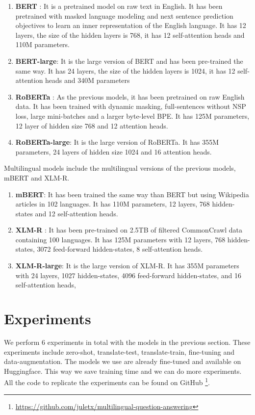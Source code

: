 \documentclass[11pt]{article}
\begin{document}
\begin{enumerate}
    \item \textbf{BERT} \cite{BERT}: It is a pretrained model on raw text in English. It has been pretrained with masked language modeling and next sentence prediction objectives to learn an inner representation of the English language. It has 12 layers, the size of the hidden layers is 768, it has 12 self-attention heads and 110M parameters.
    \item \textbf{BERT-large}: It is the large version of BERT and has been pre-trained the same way. It has 24 layers, the size of the hidden layers is 1024, it has 12 self-attention heads and 340M parameters
    \item \textbf{RoBERTa} \cite{ROBERTA}: As the previous models, it has been pretrained on raw English data. It has been trained with dynamic masking, full-sentences without NSP loss, large mini-batches and a larger byte-level BPE. It has 125M parameters, 12 layer of hidden size 768 and 12 attention heads.
    \item \textbf{RoBERTa-large}: It is the large version of RoBERTa. It has 355M parameters, 24 layers of hidden size 1024 and 16 attention heads.
\end{enumerate}

Multilingual models include the multilingual versions of the previous models, mBERT and XLM-R.

\begin{enumerate}
    \item \textbf{mBERT}: It has been trained the same way than BERT but using Wikipedia articles in 102 languages. It has 110M parameters, 12 layers, 768 hidden-states and 12 self-attention heads.
    \item \textbf{XLM-R} \cite{XLM-R}: It has been pre-trained on 2.5TB of filtered CommonCrawl data containing 100 languages. It has 125M parameters with 12 layers, 768 hidden-states, 3072 feed-forward hidden-states, 8 self-attention heads.
    \item \textbf{XLM-R-large}: It is the large version of XLM-R. It has 355M parameters with 24 layers, 1027 hidden-states, 4096 feed-forward hidden-states, and 16 self-attention heads,
\end{enumerate}

\section{Experiments}

We perform 6 experiments in total with the models in the previous section. These experiments include zero-shot, translate-test, translate-train, fine-tuning and data-augmentation. The models we use are already fine-tuned and available on Huggingface. This way we save training time and we can do more experiments. All the code to replicate the experiments can be found on GitHub \footnote{\url{https://github.com/juletx/multilingual-question-answering}}.
\end{document}
